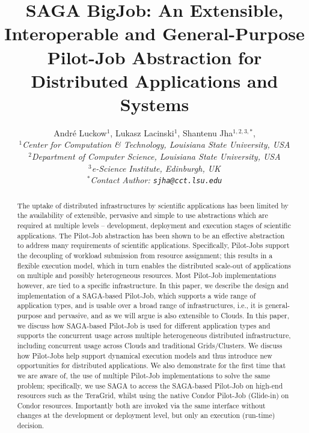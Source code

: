 \documentclass[conference,final]{IEEEtran}
\title{SAGA BigJob: An Extensible, Interoperable and General-Purpose
  Pilot-Job Abstraction for Distributed Applications and Systems}
\author{
Andr\'e Luckow$^{1}$, Lukasz Lacinski$^{1}$,   Shantenu Jha$^{1,2,3,*}$,\\
  \small{\emph{$^{1}$Center for Computation \& Technology, Louisiana State University, USA}}\\
  \small{\emph{$^{2}$Department of Computer Science, Louisiana State University, USA}}\\
  \small{\emph{$^{3}$e-Science Institute, Edinburgh, UK}}\\
  \small{\emph{$^{*}$Contact Author: \texttt{sjha@cct.lsu.edu}}}\\
}
\newcommand{\up}{\vspace*{-1em}}
\newcommand{\alnote}[1]{ {\textcolor{blue} { ***AL: #1 }}}
\newcommand{\jhanote}[1]{ {\textcolor{red} { ***SJ: #1 }}}
\newcommand{\alnote}[1]{}
\newcommand{\jhanote}[1]{}
\begin{document}
 

\maketitle    


\begin{abstract}
  The uptake of distributed infrastructures by scientific applications
  has been limited by the availability of extensible, pervasive and
  simple to use abstractions which are required at multiple levels --
  development, deployment and execution stages of scientific
  applications. The Pilot-Job abstraction has been shown to be an
  effective abstraction to address many requirements of scientific
  applications.  Specifically, Pilot-Jobs support the decoupling of
  workload submission from resource assignment; this results in a
  flexible execution model, which in turn enables the distributed
  scale-out of applications on multiple and possibly heterogeneous
  resources.  Most Pilot-Job implementations however, are tied to a
  specific infrastructure. In this paper, we describe the design and
  implementation of a SAGA-based Pilot-Job, which supports a wide
  range of application types, and is usable over a broad range of
  infrastructures, i.e., it is general-purpose and pervasive, and as
  we will argue is also extensible to Clouds.  In this paper, we
  discuss how SAGA-based Pilot-Job is used for different application
  types and supports the concurrent usage across multiple
  heterogeneous distributed infrastructure, including concurrent usage
  across Clouds and traditional Grids/Clusters.  %
  We discuss how Pilot-Jobs help support dynamical execution models
  and thus introduce new opportunities for distributed applications.
  We also demonstrate for the first time that we are aware of, the use
  of multiple Pilot-Job implementations to solve the same problem;
  specifically, we use SAGA to access the SAGA-based Pilot-Job on
  high-end resources such as the TeraGrid, whilst using the native
  Condor Pilot-Job (Glide-in) on Condor resources. Importantly both
  are invoked via the same interface without changes at the
  development or deployment level, but only an execution (run-time)
  decision.
\end{abstract}
\end{document}
